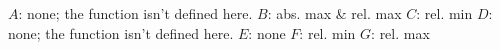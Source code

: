 {\begin{minipage}{\linewidth}
\end{minipage}
}
{$A$: none; the function isn't defined here.
$B$: abs. max \& rel. max
$C$: rel. min
$D$: none; the function isn't defined here.
$E$: none
$F$: rel. min
$G$: rel. max
}

